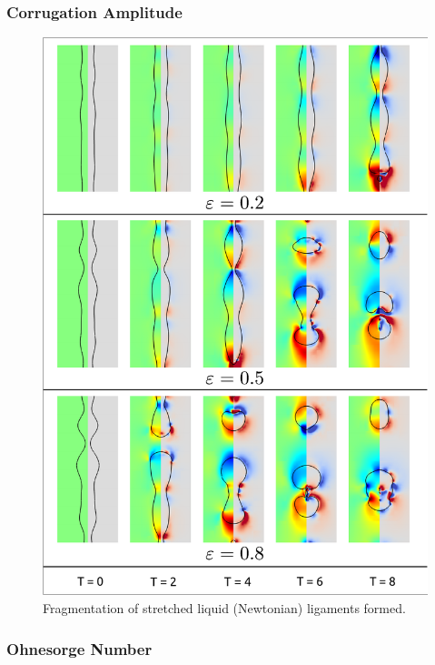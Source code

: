 


\subsubsection*{Corrugation Amplitude}

\begin{figure}
\centering
\includegraphics{plots/ligament_breakup/amplitude_compare.pdf}
\caption{Fragmentation of stretched liquid (Newtonian) ligaments formed. 
	}
\label{amp_comp}
\end{figure}

\subsubsection*{Ohnesorge Number}

